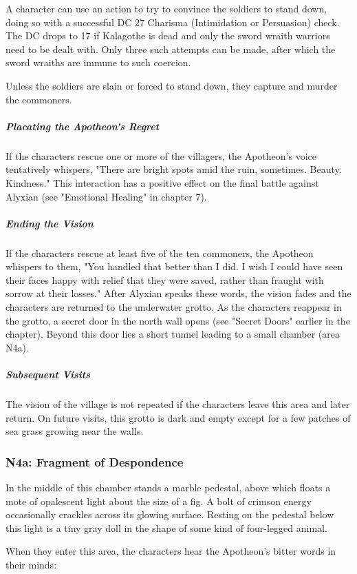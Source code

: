 \documentclass[10pt,a4paper,twoside,fancy,bg=print,twocolumn,openany,nodeprecatedcode]{dndbook}
\begin{document}
A character can use an action to try to convince the soldiers to stand down, doing so with a successful DC 27 Charisma (Intimidation or Persuasion) check. The DC drops to 17 if Kalagothe is dead and only the sword wraith warriors need to be dealt with. Only three such attempts can be made, after which the sword wraiths are immune to such coercion.

Unless the soldiers are slain or forced to stand down, they capture and murder the commoners.

\subparagraph{Placating the Apotheon's Regret}
If the characters rescue one or more of the villagers, the Apotheon's voice tentatively whispers, "There are bright spots amid the ruin, sometimes. Beauty. Kindness." This interaction has a positive effect on the final battle against Alyxian (see "Emotional Healing" in chapter 7).

\subparagraph{Ending the Vision}
If the characters rescue at least five of the ten commoners, the Apotheon whispers to them, "You handled that better than I did. I wish I could have seen their faces happy with relief that they were saved, rather than fraught with sorrow at their losses." After Alyxian speaks these words, the vision fades and the characters are returned to the underwater grotto. As the characters reappear in the grotto, a secret door in the north wall opens (see "Secret Doors" earlier in the chapter). Beyond this door lies a short tunnel leading to a small chamber (area N4a).

\subparagraph{Subsequent Visits}
The vision of the village is not repeated if the characters leave this area and later return. On future visits, this grotto is dark and empty except for a few patches of sea grass growing near the walls.

\subsubsection{N4a: Fragment of Despondence}
\begin{DndReadAloud}{}
In the middle of this chamber stands a marble pedestal, above which floats a mote of opalescent light about the size of a fig. A bolt of crimson energy occasionally crackles across its glowing surface. Resting on the pedestal below this light is a tiny gray doll in the shape of some kind of four-legged animal.

\end{DndReadAloud}

When they enter this area, the characters hear the Apotheon's bitter words in their minds:
\end{document}
